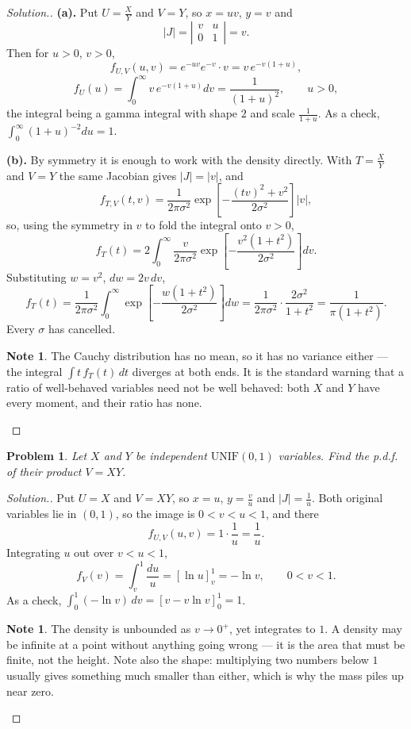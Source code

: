\documentclass[12pt,a4paper]{report}
\theoremstyle{definition}
\newtheorem{note}[thm]{Note}
\theoremstyle{plain}
\newtheorem{problemx}{Problem}[section]
\newenvironment{problem}{\begin{problemx}}{\end{problemx}}
\newenvironment{solution}
  {\renewcommand{\qedsymbol}{}\begin{proof}[\textit{Solution}.]}
  {\end{proof}}
\begin{document}
\begin{solution}
\textbf{(a).} Put $U=\frac{X}{Y}$ and $V=Y$, so $x=uv$, $y=v$ and
\[|J|=\left|\begin{matrix}v & u\\0 & 1\end{matrix}\right|=v.\]
Then for $u>0$, $v>0$,
\[f_{U,V}(u,v)=e^{-uv}e^{-v}\cdot v=v\,e^{-v(1+u)},\]
\[f_U(u)=\int_0^\infty v\,e^{-v(1+u)}dv=\frac{1}{(1+u)^2},\qquad u>0,\]
the integral being a gamma integral with shape $2$ and scale $\frac{1}{1+u}$.
As a check, $\int_0^\infty(1+u)^{-2}du=1$.

\textbf{(b).} By symmetry it is enough to work with the density directly. With
$T=\frac{X}{Y}$ and $V=Y$ the same Jacobian gives $|J|=|v|$, and
\[f_{T,V}(t,v)=\frac{1}{2\pi\sigma^2}
\exp\left[-\frac{(tv)^2+v^2}{2\sigma^2}\right]|v|,\]
so, using the symmetry in $v$ to fold the integral onto $v>0$,
\[f_T(t)=2\int_0^\infty\frac{v}{2\pi\sigma^2}
\exp\left[-\frac{v^2\left(1+t^2\right)}{2\sigma^2}\right]dv.\]
Substituting $w=v^2$, $dw=2v\,dv$,
\[f_T(t)=\frac{1}{2\pi\sigma^2}\int_0^\infty
\exp\left[-\frac{w\left(1+t^2\right)}{2\sigma^2}\right]dw
=\frac{1}{2\pi\sigma^2}\cdot\frac{2\sigma^2}{1+t^2}
=\frac{1}{\pi\left(1+t^2\right)}.\]
Every $\sigma$ has cancelled.

\begin{note}
The Cauchy distribution has no mean, so it has no variance either --- the
integral $\int t\,f_T(t)\,dt$ diverges at both ends. It is the standard warning
that a ratio of well-behaved variables need not be well behaved: both $X$ and $Y$
have every moment, and their ratio has none.
\end{note}
\end{solution}

\begin{problem}
Let $X$ and $Y$ be independent $\text{UNIF}(0,1)$ variables. Find the p.d.f. of
their product $V=XY$.
\end{problem}

\begin{solution}
Put $U=X$ and $V=XY$, so $x=u$, $y=\frac{v}{u}$ and $|J|=\frac{1}{u}$. Both
original variables lie in $(0,1)$, so the image is $0<v<u<1$, and there
\[f_{U,V}(u,v)=1\cdot\frac{1}{u}=\frac{1}{u}.\]
Integrating $u$ out over $v<u<1$,
\[f_V(v)=\int_v^1\frac{du}{u}=\left[\ln u\right]_v^1=-\ln v,\qquad 0<v<1.\]
As a check, $\int_0^1(-\ln v)\,dv=\left[v-v\ln v\right]_0^1=1$.

\begin{note}
The density is unbounded as $v\to0^+$, yet integrates to $1$. A density may be
infinite at a point without anything going wrong --- it is the area that must be
finite, not the height. Note also the shape: multiplying two numbers below $1$
usually gives something much smaller than either, which is why the mass piles up
near zero.
\end{note}
\end{solution}
\end{document}
